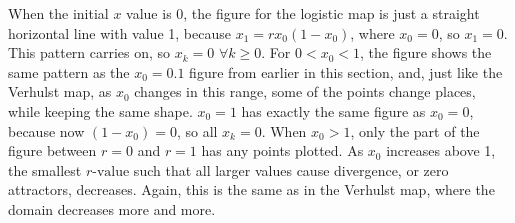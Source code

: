 \documentclass[a4wide, 10pt]{article}
\begin{document}
When the initial $x$ value is 0, the figure for the logistic map is just a straight horizontal line
 with value 1, because $x_{1} = rx_{0}(1 - x_{0})$, where $x_{0} = 0$, so $x_{1} = 0$. This pattern
  carries on, so $x_{k} = 0$ $\forall k \geq 0$. For $0 < x_{0} < 1$, the figure shows the same pattern
   as the $x_{0} = 0.1$ figure from earlier in this section, and, just like the Verhulst map, as $x_{0}$ changes in this range, some
    of the points change places, while keeping the same shape. $x_{0} = 1$ has exactly the same figure as $x_{0} = 0$, because now $(1 - x_{0}) = 0$, so all $x_{k} = 0$. When $x_{0} > 1$, only the part of the figure between $r = 0$ and $r = 1$ has any points
       plotted. As $x_{0}$ increases above 1, the smallest $r \textrm{-value}$ such that
         all larger values cause divergence, or zero attractors, decreases. Again, this is the same as
          in the Verhulst map, where the domain decreases more and more.
\end{document}
